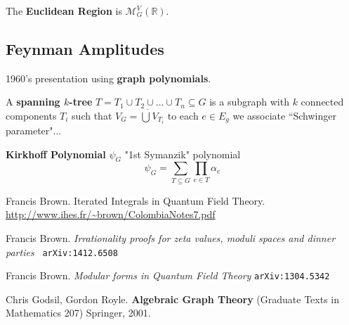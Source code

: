 \documentclass[12pt]{article}
\begin{document}
{\noindent The \textbf{Euclidean Region}  is $\mathcal{M}_G^V(\mathbb{R})$.

\subsection{Feynman Amplitudes}

1960's presentation using \textbf{graph polynomials}.  \newline \newline

\noindent A \textbf{spanning $k$-tree} $T = T_1 \cup T_2 \cup \dots \cup T_n \subseteq G$ is a subgraph with $k$ connected components $T_i$ such that $V_G = \dot{\bigcup} V_{T_i}$ to each $e \in E_g$ we associate ``Schwinger parameter"... \newline

\noindent \textbf{Kirkhoff Polynomial} $\psi_G$ "1st Symanzik" polynomial
$$ \psi_G = \sum_{T \subseteq G} \prod_{e \in T} \alpha_e $$


\begin{thebibliography}{9}

 Francis Brown.  Iterated Integrals in Quantum Field Theory.  \url{http://www.ihes.fr/~brown/ColombiaNotes7.pdf}
 
Francis Brown. \textit{Irrationality proofs for zeta values, moduli spaces and dinner parties}  \texttt{ arXiv:1412.6508}

Francis Brown. \textit{Modular forms in Quantum Field Theory}  \texttt{arXiv:1304.5342}

 Chris Godsil, Gordon Royle.  \textbf{Algebraic Graph Theory} (Graduate Texts in Mathematics 207)  Springer, 2001.

\end{thebibliography}
}
\end{document}
